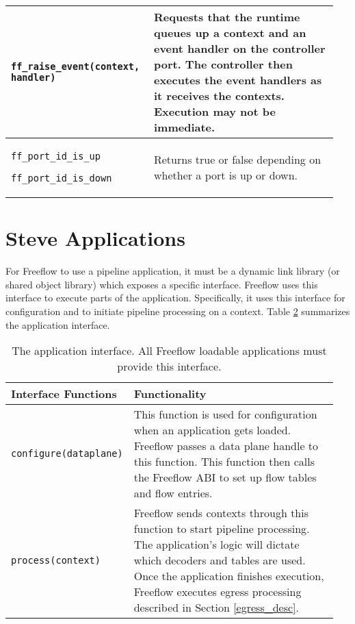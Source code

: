 \begin{table}
\begin{center}
\begin{tabular}{| p{0.4\linewidth} | p{0.55\linewidth} |}
\texttt{ff\_raise\_event(context, handler)} &
Requests that the runtime queues up a context and an event handler on the controller port. The controller then executes the event handlers as it receives the contexts. Execution may not be immediate. \\
\hline


\texttt{ff\_port\_id\_is\_up}

\texttt{ff\_port\_id\_is\_down} &

Returns true or false depending on whether a port is up or down. \\

\hline

\end{tabular}
\end{center}
\label{tbl:Freeflow_api}
\end{table}

\section{Steve Applications} \label{fp:app_interface}

For Freeflow to use a pipeline application, it must be a dynamic link library (or shared object library) which exposes a specific interface. Freeflow uses this interface to execute parts of the application. 
Specifically, it uses this interface for configuration and to initiate pipeline processing on a context.
Table \ref{tbl:steve_api} summarizes the application interface.

\begin{table}[ht]
\caption{The application interface. All Freeflow loadable applications must provide this interface.}
\begin{center}
\begin{tabular}{| p{0.3\linewidth} | p{0.65\linewidth} |}
\hline
Interface Functions & Functionality \\

\hline

\texttt{configure(dataplane)} & This function is used for configuration when an application gets loaded. Freeflow passes a data plane handle to this function. This function then calls the Freeflow ABI to set up flow tables and flow entries. \\

\hline

\texttt{process(context)} & Freeflow sends contexts through this function to start pipeline processing. The application's logic will dictate which decoders and tables are used. Once the application finishes execution, Freeflow executes egress processing described in Section \ref{egress_desc}. \\

\hline

\end{tabular}
\end{center}
\label{tbl:steve_api}
\end{table}

